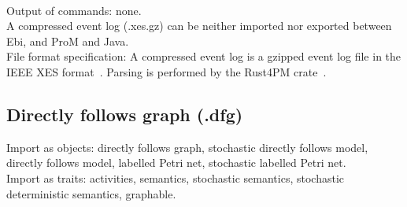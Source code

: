 {\\Output of commands: none.
\\A compressed event log (.xes.gz) can be neither imported nor exported between Ebi, and ProM and Java.
\\File format specification:
A compressed event log is a gzipped event log file in the IEEE XES format~\cite{DBLP:journals/cim/AcamporaVSAGV17}.
Parsing is performed by the Rust4PM crate~\cite{DBLP:conf/bpm/KustersA24}.
\clearpage
\subsection{Directly follows graph (.dfg)}
\label{filehandler:directly follows graph}
Import as objects: directly follows graph, stochastic directly follows model, directly follows model, labelled Petri net, stochastic labelled Petri net.
\\Import as traits: activities, semantics, stochastic semantics, stochastic deterministic semantics, graphable.
}
